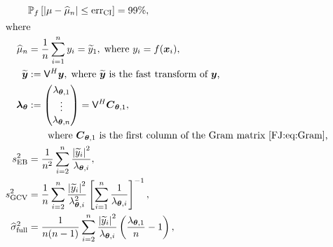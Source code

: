 \documentclass[graybox,footinfo]{svmult}
\newcommand{\abs}[1]{\left\lvert #1 \right\rvert} %
\begin{document}
		\begin{align}
			\nonumber
			&\mathbb{P}_f \left[
			|\mu-\widehat{\mu}_n| \leq \textup{err}_{\textup{CI}}
			\right] = 99\%, \\
			\intertext{where}
			\label{FJ:muhatGCV-FB-MLE-Simple}
			\widehat{\mu}_n &= \frac 1n \sum_{i=1}^n y_i = \widetilde{y}_1, \;  \text{where $y_i =f(\bsx_i)$},\\
		\nonumber 
		\widetilde{\bsy} &:= \mathsf{V}^H \bsy, \; \text{where $\widetilde{\bsy}$ is the fast transform of $\bsy$,}  \\
		\nonumber 
		{\bslambda}_\bstheta &:= \begin{pmatrix}
			\lambda_{\bstheta,1} \\ \vdots \\ \lambda_{\bstheta,n} \end{pmatrix} = \mathsf{V}^H \bsC_{\bstheta,1}, \\ & \nonumber \qquad \text{where $\bsC_{\bstheta,1}$ is the first column of the Gram matrix \eqref{FJ:eq:Gram},} \\
		\nonumber
		s^2_\textup{EB} 
		& =
		\frac{1}{n^2} 
		\sum_{i=2}^n \frac{\abs{\widetilde{y}_i}^2}{\lambda_{\bstheta,i}},  \\
		\nonumber 
		s^2_{\textup{GCV}} & =  \frac 1{n} \sum_{i=2}^n \frac{\abs{\widetilde{y}_i}^2}{\lambda_{\bstheta,i}^2}  \left [ \sum_{i=1}^n \frac{1}{\lambda_{\bstheta,i}} \right]^{-1}, \\
		\nonumber
		\widehat{\sigma}^2_{\textup{full}} &= \frac{1}{n(n-1)} \sum_{i=2}^n \frac{\abs{\widetilde{y}_i}^2}{\lambda_{\bstheta,i}}  \left(\frac{\lambda_{\bstheta,1}}{n}  - 1  \right), 
		\end{align}
\end{document}
